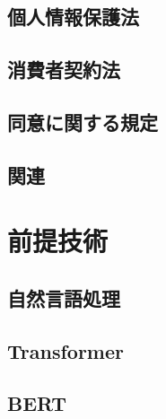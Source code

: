 \subsection{個人情報保護法}


\subsection{消費者契約法}


\subsection{同意に関する規定}


\subsection{関連}

\section{前提技術}

\subsection{自然言語処理}

\subsection{Transformer}

\subsection{BERT}


